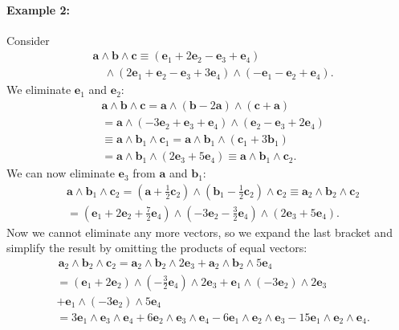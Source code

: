 \paragraph{Example 2:}

Consider\begin{align*}
 & \mathbf{a}\wedge\mathbf{b}\wedge\mathbf{c}\equiv(\mathbf{e}_{1}+2\mathbf{e}_{2}-\mathbf{e}_{3}+\mathbf{e}_{4})\\
 & \quad\wedge(2\mathbf{e}_{1}+\mathbf{e}_{2}-\mathbf{e}_{3}+3\mathbf{e}_{4})\wedge(-\mathbf{e}_{1}-\mathbf{e}_{2}+\mathbf{e}_{4}).\end{align*}
We eliminate $\mathbf{e}_{1}$ and $\mathbf{e}_{2}$:\begin{align*}
 & \mathbf{a}\wedge\mathbf{b}\wedge\mathbf{c}=\mathbf{a}\wedge(\mathbf{b}-2\mathbf{a})\wedge(\mathbf{c}+\mathbf{a})\\
 & =\mathbf{a}\wedge\left(-3\mathbf{e}_{2}+\mathbf{e}_{3}+\mathbf{e}_{4}\right)\wedge\left(\mathbf{e}_{2}-\mathbf{e}_{3}+2\mathbf{e}_{4}\right)\\
 & \equiv\mathbf{a}\wedge\mathbf{b}_{1}\wedge\mathbf{c}_{1}=\mathbf{a}\wedge\mathbf{b}_{1}\wedge(\mathbf{c}_{1}+3\mathbf{b}_{1})\\
 & =\mathbf{a}\wedge\mathbf{b}_{1}\wedge(2\mathbf{e}_{3}+5\mathbf{e}_{4})\equiv\mathbf{a}\wedge\mathbf{b}_{1}\wedge\mathbf{c}_{2}.\end{align*}
We can now eliminate $\mathbf{e}_{3}$ from $\mathbf{a}$ and $\mathbf{b}_{1}$:\begin{align*}
 & \mathbf{a}\wedge\mathbf{b}_{1}\wedge\mathbf{c}_{2}=(\mathbf{a}+\frac{1}{2}\mathbf{c}_{2})\wedge(\mathbf{b}_{1}-\frac{1}{2}\mathbf{c}_{2})\wedge\mathbf{c}_{2}\equiv\mathbf{a}_{2}\wedge\mathbf{b}_{2}\wedge\mathbf{c}_{2}\\
 & =(\mathbf{e}_{1}+2\mathbf{e}_{2}+\frac{7}{2}\mathbf{e}_{4})\wedge(-3\mathbf{e}_{2}-\frac{3}{2}\mathbf{e}_{4})\wedge(2\mathbf{e}_{3}+5\mathbf{e}_{4}).\end{align*}
Now we cannot eliminate any more vectors, so we expand the last bracket
and simplify the result by omitting the products of equal vectors:
\begin{align*}
 & \,\mathbf{a}_{2}\wedge\mathbf{b}_{2}\wedge\mathbf{c}_{2}=\mathbf{a}_{2}\wedge\mathbf{b}_{2}\wedge2\mathbf{e}_{3}+\mathbf{a}_{2}\wedge\mathbf{b}_{2}\wedge5\mathbf{e}_{4}\\
 & =\left(\mathbf{e}_{1}+2\mathbf{e}_{2}\right)\wedge(-\frac{3}{2}\mathbf{e}_{4})\wedge2\mathbf{e}_{3}+\mathbf{e}_{1}\wedge(-3\mathbf{e}_{2})\wedge2\mathbf{e}_{3}\\
 & +\mathbf{e}_{1}\wedge(-3\mathbf{e}_{2})\wedge5\mathbf{e}_{4}\\
 & =3\mathbf{e}_{1}\wedge\mathbf{e}_{3}\wedge\mathbf{e}_{4}+6\mathbf{e}_{2}\wedge\mathbf{e}_{3}\wedge\mathbf{e}_{4}-6\mathbf{e}_{1}\wedge\mathbf{e}_{2}\wedge\mathbf{e}_{3}-15\mathbf{e}_{1}\wedge\mathbf{e}_{2}\wedge\mathbf{e}_{4}.\end{align*}
 


